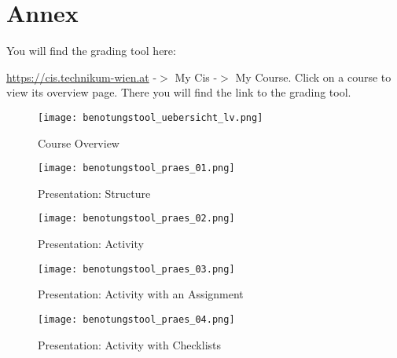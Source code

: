 \section{Annex}

You will find the grading tool here:

\url{https://cis.technikum-wien.at} -$>$ My Cis -$>$ My Course. Click on a course to view its overview page. There you will find the link to the grading tool.
\begin{figure}[ht]
\begin{center}
\texttt{[image: benotungstool\_uebersicht\_lv.png]}
\end{center}
\caption{Course Overview}\label{uebersicht_lv}
\end{figure}

\begin{figure}[ht]
\begin{center}
\texttt{[image: benotungstool\_praes\_01.png]}
\end{center}
\caption{Presentation: Structure}\label{struktur}
\end{figure}

\begin{figure}[ht]
\begin{center}
\texttt{[image: benotungstool\_praes\_02.png]}
\end{center}
\caption{Presentation: Activity}\label{uebung}
\end{figure}

\begin{figure}[ht]
\begin{center}
\texttt{[image: benotungstool\_praes\_03.png]}
\end{center}
\caption{Presentation: Activity with an Assignment}\label{uebung_abgabe}
\end{figure}

\begin{figure}[ht]
\begin{center}
\texttt{[image: benotungstool\_praes\_04.png]}
\end{center}
\caption{Presentation: Activity with Checklists}\label{uebung_kreuzerllisten}
\end{figure}